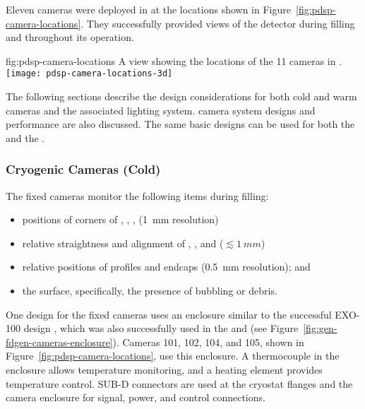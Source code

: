 Eleven cameras were deployed in  at the locations shown in Figure~\ref{fig:pdsp-camera-locations}. They successfully provided views of the detector during filling and throughout %
its operation. %

\begin{dunefigure}{fig:pdsp-camera-locations}
  {A \threed view showing the locations of the 11 cameras in .}
  \texttt{[image: pdsp-camera-locations-3d]}%
\end{dunefigure}

The following sections describe the design considerations for both cold
and warm cameras and the associated lighting system.  camera system designs and performance are also discussed.  
The same basic
designs can be used for both the  and the . %



\subsubsection{Cryogenic Cameras (Cold)}

The fixed cameras
monitor the following items during filling:
\begin{itemize}
\item positions of corners of , , ,  (\SI{1}{mm} resolution)
\item relative straightness and alignment of , , and  (\(\lesssim\SI{1}{mm}\))
\item relative positions of profiles and endcaps (\SI{0.5}{mm} resolution); and 
\item the  surface, specifically, the presence of bubbling or debris.
\end{itemize}




One design for the  fixed cameras uses an enclosure similar to
the successful EXO-100 design \cite{Delaquis:2013hva}, which was also
successfully used in the 
and  (see Figure~\ref{fig:gen-fdgen-cameras-enclosure}). Cameras 101, 102, 104, and 105, shown in Figure~\ref{fig:pdsp-camera-locations}, use this enclosure.
A thermocouple in the enclosure allows temperature monitoring, and a heating element provides temperature control.  
SUB-D connectors are used at the cryostat flanges and the camera enclosure for signal, power, and control connections.

